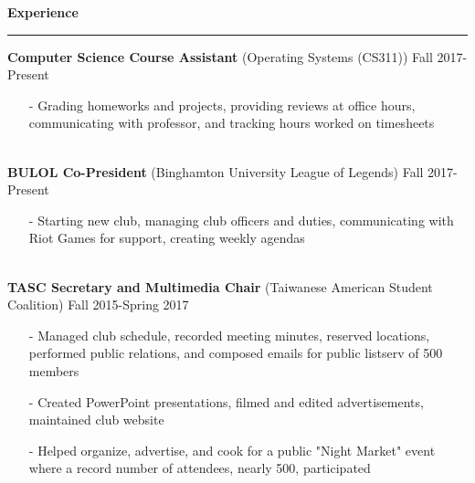 \documentclass[10pt]{article}
\newcommand{\Hrule}{\vspace{0.7mm}\hrule\vspace{0.7mm}}
\begin{document}
    \noindent\large\textbf{Experience}
        \Hrule
        \indent\small{\textbf{Computer Science Course Assistant} (Operating Systems (CS311))} \hfill \small{Fall 2017-Present}\indent\vspace{0.5mm}\\
            \indent\begin{minipage}{\dimexpr\textwidth-6cm}
                \begin{itemize}[noitemsep, topsep=0pt]
                    \item[-] Grading homeworks and projects, providing reviews at office hours, communicating with professor, and tracking hours worked on timesheets
                \end{itemize}\vspace{0mm}
            \end{minipage}\\
        \indent\small{\textbf{BULOL Co-President} (Binghamton University League of Legends)} \hfill \small{Fall 2017-Present}\indent\vspace{0.5mm}\\
            \indent\begin{minipage}{\dimexpr\textwidth-6cm}
                \begin{itemize}[noitemsep, topsep=0pt]
                    \item[-] Starting new club, managing club officers and duties, communicating with Riot Games for support, creating weekly agendas
                \end{itemize}\vspace{0mm}
            \end{minipage}\\
        \indent\small{\textbf{TASC Secretary and Multimedia Chair} (Taiwanese American Student Coalition)} \hfill \small{Fall 2015-Spring 2017}\indent\vspace{0.5mm}
            \indent\begin{minipage}{\dimexpr\textwidth-6cm}
                \begin{itemize}[noitemsep, topsep=0pt]
                    \item[-] Managed club schedule, recorded meeting minutes, reserved locations, performed public relations, and composed emails for public listserv of 500 members
                    \item[-] Created PowerPoint presentations, filmed and edited advertisements, maintained club website
                    \item[-] Helped organize, advertise, and cook for a public "Night Market" event where a record number of attendees, nearly 500, participated
                \end{itemize}\vspace{0mm}
            \end{minipage}\\
\end{document}
